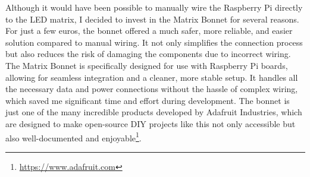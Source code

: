 Although it would have been possible to manually wire the Raspberry Pi directly to the LED matrix, I decided to invest in the Matrix Bonnet for several reasons. For just a few euros, the bonnet offered a much safer, more reliable, and easier solution compared to manual wiring. It not only simplifies the connection process but also reduces the risk of damaging the components due to incorrect wiring. The Matrix Bonnet is specifically designed for use with Raspberry Pi boards, allowing for seamless integration and a cleaner, more stable setup. It handles all the necessary data and power connections without the hassle of complex wiring, which saved me significant time and effort during development. The bonnet is just one of the many incredible products developed by Adafruit Industries, which are designed to make open-source DIY projects like this not only accessible but also well-documented and enjoyable\footnote{\url{https://www.adafruit.com}}.
